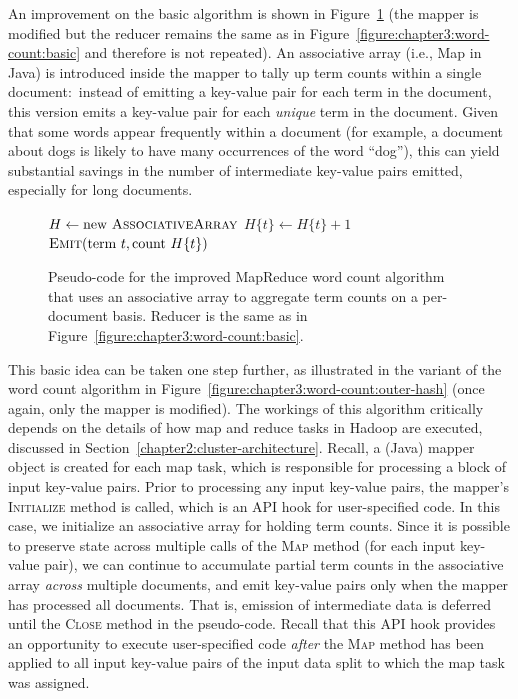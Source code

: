 An improvement on the basic algorithm is shown in
Figure~\ref{figure:chapter3:word-count:inner-hash} (the mapper is
modified but the reducer remains the same as in
Figure~\ref{figure:chapter3:word-count:basic} and therefore is not
repeated).  An associative array (i.e., Map in Java) is introduced
inside the mapper to tally up term counts within a single
document:\ instead of emitting a key-value pair for each term in the
document, this version emits a key-value pair for each {\it unique}
term in the document.  Given that some words appear frequently within
a document (for example, a document about dogs is likely to have many
occurrences of the word ``dog''), this can yield substantial savings
in the number of intermediate key-value pairs emitted, especially for
long documents.

\begin{figure}[t]
\algrenewcommand{}
\algrenewcommand{}
  \begin{algorithmic}[1]
    \State $H \gets \textrm{new }\textsc{AssociativeArray}$
      \State $H\{t\} \gets H\{t\} + 1$
    \EndFor
    \State $\textsc{Emit}(\textrm{term }t, \textrm{count }H\{t\} )$
    \EndFor
    \EndProcedure
    \EndFunction
  \end{algorithmic}
  \caption{Pseudo-code for the improved MapReduce word count algorithm
    that uses an associative array to aggregate term counts on a
    per-document basis.  Reducer is the same as in
    Figure~\ref{figure:chapter3:word-count:basic}.}
\label{figure:chapter3:word-count:inner-hash}
\end{figure}

This basic idea can be taken one step further, as illustrated in the
variant of the word count algorithm in
Figure~\ref{figure:chapter3:word-count:outer-hash} (once again, only
the mapper is modified).  The workings of this algorithm critically
depends on the details of how map and reduce tasks in Hadoop are
executed, discussed in Section~\ref{chapter2:cluster-architecture}.
Recall, a (Java) mapper object is created for each map task, which is
responsible for processing a block of input key-value pairs.  Prior to
processing any input key-value pairs, the mapper's \textsc{Initialize}
method is called, which is an API hook for user-specified code.  In
this case, we initialize an associative array for holding term counts.
Since it is possible to preserve state across multiple calls of the
\textsc{Map} method (for each input key-value pair), we can continue
to accumulate partial term counts in the associative array {\it
  across} multiple documents, and emit key-value pairs only when the
mapper has processed all documents.  That is, emission of intermediate
data is deferred until the \textsc{Close} method in the pseudo-code.
Recall that this API hook provides an opportunity to execute
user-specified code {\it after} the \textsc{Map} method has been
applied to all input key-value pairs of the input data split to which
the map task was assigned.

